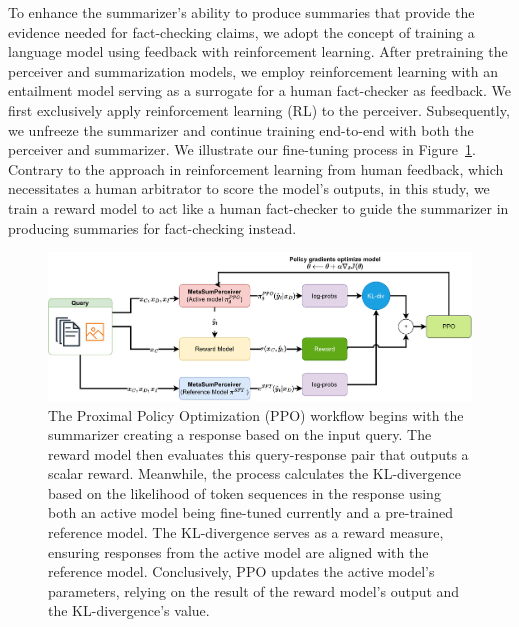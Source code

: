 To enhance the summarizer's ability to produce summaries that provide the evidence needed for fact-checking claims, we adopt the concept of training a language model using feedback with reinforcement learning. After pretraining the perceiver and summarization models, we employ reinforcement learning with an entailment model serving as a surrogate for a human fact-checker as feedback. We first exclusively apply reinforcement learning (RL) to the perceiver. Subsequently, we unfreeze the summarizer and continue training end-to-end with both the perceiver and summarizer. We illustrate our fine-tuning process in Figure~\ref{fig:rl_ppo}. Contrary to the approach in reinforcement learning from human feedback, which necessitates a human arbitrator to score the model's outputs, in this study, we train a reward model to act like a human fact-checker to guide the summarizer in producing summaries for fact-checking instead.

\begin{figure}
  \centering
  \includegraphics[width=\textwidth,height=\textwidth,keepaspectratio]{images/ppo.pdf}
  \caption{The Proximal Policy Optimization (PPO) workflow begins with the summarizer creating a response based on the input query. The reward model then evaluates this query-response pair that outputs a scalar reward. Meanwhile, the process calculates the KL-divergence based on the likelihood of token sequences in the response using both an active model being fine-tuned currently and a pre-trained reference model. The KL-divergence serves as a reward measure, ensuring responses from the active model are aligned with the reference model. Conclusively, PPO updates the active model's parameters, relying on the result of the reward model's output and the KL-divergence's value.}
  \label{fig:rl_ppo}
\end{figure}

